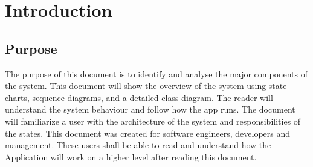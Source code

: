 \documentclass[english]{article}
\begin{document}
\vspace*{\fill} 
\vspace*{\fill} 

\newpage

\tableofcontents

\newpage

\setcounter{page}{1}
\raggedright    

\section{Introduction}
\label{sec:introduction}

\subsection{Purpose}
\label{sub:purpose}
The purpose of this document is to identify and analyse the major components of the system. This document will show the overview of the system using state charts, sequence diagrams, and a detailed class diagram.  The reader will understand the system behaviour and follow how the app runs. The document will familiarize a user with the architecture of the system and responsibilities of the states. This document was created for software engineers, developers and management. These users shall be able to read and understand how the Application will work on a higher level after reading this document.
\end{document}
